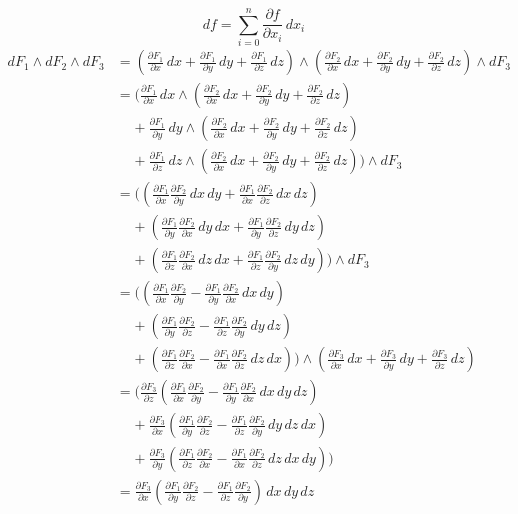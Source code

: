 \documentclass{article}
\newcommand{\partis}[2]{\frac{\partial #2}{\partial #1}}
\begin{document}
\begin{enumerate}
\begin{enumerate}
            \[ df = \sum_{i=0}^{n} \partis{x_i}{f} \, dx_i \]
            \begin{align*} 
                dF_1 \wedge dF_2 \wedge dF_3 &= (\partis{x}{F_1} \, dx + \partis{y}{F_1} \, dy + \partis{z}{F_1} \, dz) \wedge (\partis{x}{F_2} \, dx + \partis{y}{F_2} \, dy + \partis{z}{F_2} \, dz) \wedge dF_3 \\
                &= (\partis{x}{F_1} \, dx \wedge (\partis{x}{F_2} \, dx + \partis{y}{F_2} \, dy + \partis{z}{F_2} \, dz) \\
                &\; \; \; \; + \partis{y}{F_1} \, dy \wedge (\partis{x}{F_2} \, dx + \partis{y}{F_2} \, dy + \partis{z}{F_2} \, dz) \\
                &\; \; \; \; + \partis{z}{F_1} \, dz \wedge (\partis{x}{F_2} \, dx + \partis{y}{F_2} \, dy + \partis{z}{F_2} \, dz) ) \wedge dF_3 \\
                &= ((\partis{x}{F_1} \partis{y}{F_2} \, dx \, dy + \partis{x}{F_1} \partis{z}{F_2} \, dx \, dz) \\
                &\; \; \; \; + (\partis{y}{F_1} \partis{x}{F_2} \, dy \, dx + \partis{y}{F_1} \partis{z}{F_2} \, dy \, dz) \\
                &\; \; \; \; + (\partis{z}{F_1} \partis{x}{F_2} \, dz \, dx + \partis{z}{F_1} \partis{y}{F_2} \, dz \, dy))\wedge dF_3 \\
                &= ((\partis{x}{F_1} \partis{y}{F_2} - \partis{y}{F_1} \partis{x}{F_2}\, dx \, dy) \\
                &\; \; \; \; + (\partis{y}{F_1} \partis{z}{F_2} - \partis{z}{F_1} \partis{y}{F_2} \, dy \, dz) \\
                &\; \; \; \; + (\partis{z}{F_1} \partis{x}{F_2} - \partis{x}{F_1} \partis{z}{F_2} \, dz \, dx ))\wedge (\partis{x}{F_3} \, dx + \partis{y}{F_3} \, dy + \partis{z}{F_3} \, dz) \\
                &= (\partis{z}{F_3} (\partis{x}{F_1} \partis{y}{F_2} - \partis{y}{F_1} \partis{x}{F_2}\, dx \, dy \, dz) \\
                &\; \; \; \; + \partis{x}{F_3} (\partis{y}{F_1} \partis{z}{F_2} - \partis{z}{F_1} \partis{y}{F_2} \, dy \, dz \, dx) \\
                &\; \; \; \; + \partis{y}{F_3} (\partis{z}{F_1} \partis{x}{F_2} - \partis{x}{F_1} \partis{z}{F_2} \, dz \, dx \, dy)) \\
                &=  \partis{x}{F_3} (\partis{y}{F_1} \partis{z}{F_2} - \partis{z}{F_1} \partis{y}{F_2}) \, dx \, dy \, dz \\

\end{align*}
\end{enumerate}
\end{enumerate}
\end{document}
